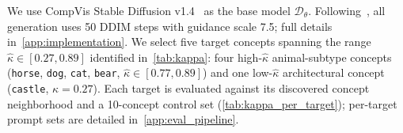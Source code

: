 We use CompVis Stable Diffusion v1.4~\citep{rombach2022high} as the base model $\mathcal{D}_\theta$. Following~\citep{gandikota2023erasing}, all generation uses 50 DDIM steps with guidance scale 7.5; 
full details in~\cref{app:implementation}.
We select five target concepts spanning the range $\hat\kappa \in [0.27, 0.89]$ identified in~\cref{tab:kappa}: 
four high-$\hat\kappa$ animal-subtype concepts (\texttt{horse}, \texttt{dog}, \texttt{cat}, \texttt{bear}, $\hat\kappa \in [0.77, 0.89]$) and one low-$\hat\kappa$ architectural concept (\texttt{castle}, $\hat\kappa = 0.27$). Each target is evaluated against its discovered concept neighborhood and a 10-concept control set (\cref{tab:kappa_per_target}); per-target prompt sets are detailed in~\cref{app:eval_pipeline}. 


